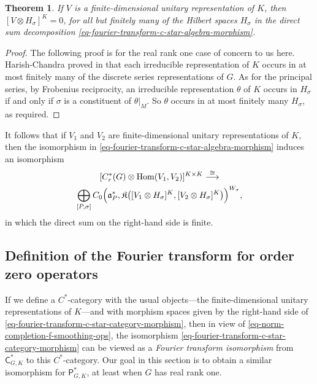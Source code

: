 \documentclass[leqno,11pt]{amsart}
\numberwithin{equation}{subsection}
\theoremstyle{plain}
\newtheorem{theorem}[equation]{Theorem}
\theoremstyle{definition}
\theoremstyle{remark}
\newcommand{\PSDO}{\mathsf{P}}
\newcommand{\CC}{\mathsf{C}}
\begin{document}
\begin{theorem} 
\label{thm-uniform-admissibility}
If $V$ is a finite-dimensional unitary representation of $K$, then $[V\otimes H_\sigma]^K=0$,  for all but finitely many of the Hilbert spaces $H_\sigma$ in the direct sum decomposition \eqref{eq-fourier-transform-c-star-algebra-morphism}.
\end{theorem}

\begin{proof}
The following proof is for the real rank one case of concern to us here. Harish-Chandra proved in  \cite{HarishChandra66}  that  each irreducible representation of $K $ occurs   in at most  finitely many of the discrete series  representations  of $G$.  As for the principal series, by Frobenius reciprocity, an irreducible representation $\theta$ of $K$ occurs in $H_\sigma$ if and only if $\sigma$ is a  constituent of $\theta\vert_{M}$.  So $\theta$ occurs in at most finitely many  $H_\sigma$, as required.
\end{proof}

It follows that if $V_1$ and $V_2$ are finite-dimensional unitary representations  of $K$, then the isomorphism in \eqref{eq-fourier-transform-c-star-algebra-morphism}   induces an isomorphism
\begin{multline}
\label{eq-fourier-transform-c-star-category-morphism}
[ C_r^*(G) \otimes \operatorname{Hom}(V_1,V_2) ]^{K \times K}\stackrel \cong \longrightarrow 
\\
\bigoplus _{[P,\sigma]}
C_0\Bigl  (\mathfrak{a}^*_P, \mathfrak{K}\bigl ([V_1\otimes H_\sigma]^K,[V_2\otimes H_\sigma]^K\bigr )\Bigr ) ^{W_\sigma},
\end{multline}
in which the direct sum on the right-hand side is finite.  



 

\subsection{Definition of the Fourier transform for order zero operators}
If we define a $C^*$-category with the usual objects---the finite-dimensional unitary representations of $K$---and with morphism spaces given by the  right-hand side  of \eqref{eq-fourier-transform-c-star-category-morphism}, then in view of  \eqref{eq-norm-completion-f-smoothing-ops}, the isomorphism  \eqref{eq-fourier-transform-c-star-category-morphism} can be viewed as a \emph{Fourier transform isomorphism}   from $\CC_{G,K}^*$ to this $C^*$-category.  Our goal in this section is to obtain a similar isomorphism for  $\PSDO^*_{G,K}$, at least when $G$ has real rank one.
\end{document}
